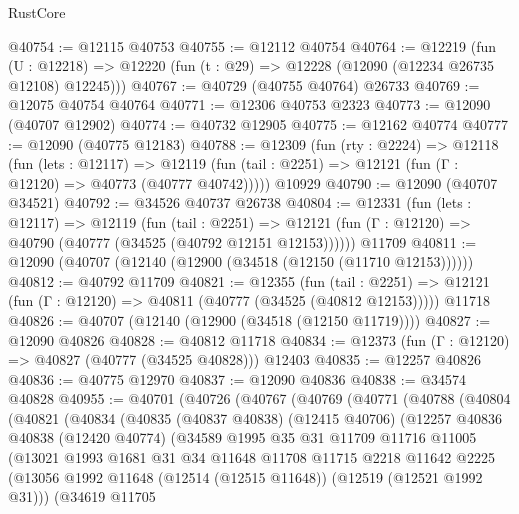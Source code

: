 \begin{lexlean}{RustCore}
\begin{coremodule}
@40754 := @12115 @40753
@40755 := @12112 @40754
@40764 := @12219
    (fun (U : @12218) => @12220 (fun (t : @29) => @12228 (@12090 (@12234 @26735 @12108) @12245)))
@40767 := @40729 (@40755 @40764) @26733
@40769 := @12075 @40754 @40764
@40771 := @12306 @40753 @2323
@40773 := @12090 (@40707 @12902)
@40774 := @40732 @12905
@40775 := @12162 @40774
@40777 := @12090 (@40775 @12183)
@40788 := @12309
    (fun (rty : @2224) =>
    @12118
      (fun (lets : @12117) =>
      @12119 (fun (tail : @2251) => @12121 (fun (Γ : @12120) => @40773 (@40777 @40742)))))
    @10929
@40790 := @12090 (@40707 @34521)
@40792 := @34526 @40737 @26738
@40804 := @12331
    (fun (lets : @12117) =>
    @12119
      (fun (tail : @2251) =>
      @12121 (fun (Γ : @12120) => @40790 (@40777 (@34525 (@40792 @12151 @12153))))))
    @11709
@40811 := @12090 (@40707 (@12140 (@12900 (@34518 (@12150 (@11710 @12153))))))
@40812 := @40792 @11709
@40821 := @12355
    (fun (tail : @2251) => @12121 (fun (Γ : @12120) => @40811 (@40777 (@34525 (@40812 @12153)))))
    @11718
@40826 := @40707 (@12140 (@12900 (@34518 (@12150 @11719))))
@40827 := @12090 @40826
@40828 := @40812 @11718
@40834 := @12373 (fun (Γ : @12120) => @40827 (@40777 (@34525 @40828))) @12403
@40835 := @12257 @40826
@40836 := @40775 @12970
@40837 := @12090 @40836
@40838 := @34574 @40828
@40955 := @40701
    (@40726
      (@40767
        (@40769
          (@40771
            (@40788
              (@40804
                (@40821
                  (@40834
                    (@40835
                      (@40837 @40838)
                      (@12415 @40706)
                      (@12257
                        @40836
                        @40838
                        (@12420 @40774)
                        (@34589
                          @1995
                          @35
                          @31
                          @11709
                          @11716
                          @11005
                          (@13021
                            @1993
                            @1681
                            @31
                            @34
                            @11648
                            @11708
                            @11715
                            @2218
                            @11642
                            @2225
                            (@13056
                              @1992
                              @11648
                              (@12514 (@12515 @11648))
                              (@12519 (@12521 @1992 @31)))
                            (@34619
                              @11705

\end{coremodule}
\end{lexlean}
